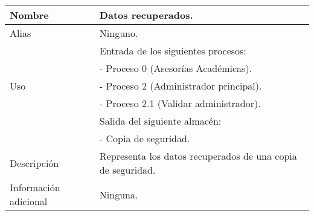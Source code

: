 \begin{center}
  \begin{tabular}{| l | p{9cm} |}
    \hline
    Nombre & \textbf{Datos recuperados}.\\
    \hline
    Alias & Ninguno.\\
    \hline
    \multirow{5}{*}{Uso} & Entrada de los siguientes procesos:\\
                         & - Proceso 0 (Asesorías Académicas).\\
                         & - Proceso 2 (Administrador principal).\\
                         & - Proceso 2.1 (Validar administrador).\\
                         & Salida del siguiente almacén:\\
                         & - Copia de seguridad.\\
    \hline
    Descripción & Representa los datos recuperados de una copia de seguridad.
\\
    \hline
    Información adicional & Ninguna.\\
    \hline
  \end{tabular}
\end{center}
